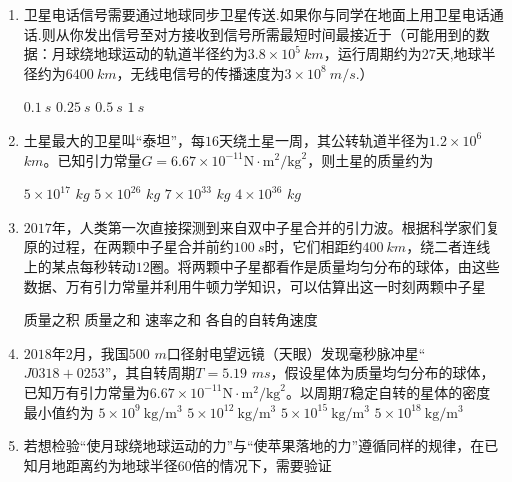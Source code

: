 \begin{enumerate}[leftmargin=0em]
\item 
{}
卫星电话信号需要通过地球同步卫星传送.如果你与同学在地面上用卫星电话通话.则从你发出信号至对方接收到信号所需最短时间最接近于（可能用到的数据：月球绕地球运动的轨道半径约为$ 3.8 \times 10^5 \ km $，运行周期约为$ 27 $天,地球半径约为$ 6400 \ km $，无线电信号的传播速度为$ 3 \times 10^8 \ m/s $.）  

\fourchoices
{$ 0.1\ s $ }
{$ 0.25\ s $}
{$ 0.5\ s $ }
{$ 1\ s $}



\item 
{}
土星最大的卫星叫“泰坦”，每$ 16 $天绕土星一周，其公转轨道半径为$ 1.2 \times 10^6 $ $ km $。已知引力常量$G = 6.67 \times 10 ^ { - 11 } \mathrm { N } \cdot \mathrm { m } ^ { 2 } / \mathrm { kg } ^ { 2 }$，则土星的质量约为  

\fourchoices
{$ 5 \times 10^{17} $ $ kg $}
{$ 5 \times 10^{26} $ $ kg $}
{$ 7 \times 10^{33} $ $ kg $}
{$ 4 \times 10^{36} $ $ kg $}



\item 
{}
$ 2017 $年，人类第一次直接探测到来自双中子星合并的引力波。根据科学家们复原的过程，在两颗中子星合并前约$ 100\ s $时，它们相距约$ 400\ km $，绕二者连线上的某点每秒转动$ 12 $圈。将两颗中子星都看作是质量均匀分布的球体，由这些数据、万有引力常量并利用牛顿力学知识，可以估算出这一时刻两颗中子星  

\fourchoices
{质量之积}
{质量之和}
{速率之和 }
{各自的自转角速度}



\item 
{}
$ 2018 $年$ 2 $月，我国$ 500 $ $ m $口径射电望远镜（天眼）发现毫秒脉冲星“$ J0318+0253 $”，其自转周期$ T=5.19 $ $ ms $，假设星体为质量均匀分布的球体，已知万有引力常量为$6.67 \times 10 ^ { - 11 } \mathrm { N } \cdot \mathrm { m } ^ { 2 } / \mathrm { kg } ^ { 2 }$。以周期$ T $稳定自转的星体的密度最小值约为  
\fourchoices
{$5 \times 10 ^ { 9 } \ \mathrm { kg } / \mathrm { m } ^ { 3 }$}
{$5 \times 10 ^ { 12 } \ \mathrm { kg } / \mathrm { m } ^ { 3 }$}
{$5 \times 10 ^ { 15 } \ \mathrm { kg } / \mathrm { m } ^ { 3 }$}
{$5 \times 10 ^ { 18 } \ \mathrm { kg } / \mathrm { m } ^ { 3 }$}



\item 
{}
若想检验“使月球绕地球运动的力”与“使苹果落地的力”遵循同样的规律，在已知月地距离约为地球半径$ 60 $倍的情况下，需要验证  


\end{enumerate}
